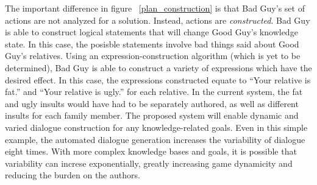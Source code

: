\documentclass{article}
\begin{document}
The important difference in figure ~\ref{plan_construction} is that Bad Guy's
set of actions are not analyzed for a solution.  Instead, actions are
\emph{constructed}.  Bad Guy is able to construct logical statements
that will change Good Guy's knowledge state.  In this case, the posisble
statements involve bad things said about Good Guy's relatives.  Using
an expression-construction algorithm (which is yet to be determined),
Bad Guy is able to construct a variety of expressions which have the
desired effect.  In this case, the expressions constructed equate to
``Your relative is fat.'' and ``Your relative is ugly.'' for each relative.
In the current system, the fat and ugly insults would have had to be separately
authored, as well as different insults for each family member.
The proposed system will enable dynamic and varied dialogue construction for any
knowledge-related goals.  Even in this simple example, the automated
dialogue generation increases the variability of dialogue eight times.
With more complex knowledge bases and goals, it is possible that
variability can increse exponentially, greatly increasing game
dynamicity and reducing the burden on the authors.


  







  
\end{document}
